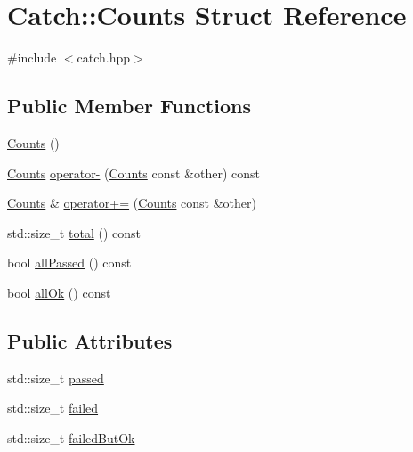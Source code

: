 \hypertarget{struct_catch_1_1_counts}{}\section{Catch\+:\+:Counts Struct Reference}
\label{struct_catch_1_1_counts}


{\ttfamily \#include $<$catch.\+hpp$>$}

\subsection*{Public Member Functions}
\begin{DoxyCompactItemize}
\item 
\hyperlink{struct_catch_1_1_counts_aab9092ce70d4b0179cc743555d2fc39b}{Counts} ()
\item 
\hyperlink{struct_catch_1_1_counts}{Counts} \hyperlink{struct_catch_1_1_counts_aaa10666f559057e3e860d2a5a6fae4c4}{operator-\/} (\hyperlink{struct_catch_1_1_counts}{Counts} const \&other) const
\item 
\hyperlink{struct_catch_1_1_counts}{Counts} \& \hyperlink{struct_catch_1_1_counts_a322a89475cd2cc039140ef371e973677}{operator+=} (\hyperlink{struct_catch_1_1_counts}{Counts} const \&other)
\item 
std\+::size\+\_\+t \hyperlink{struct_catch_1_1_counts_a94f969c09cf52d1339c085c9603cd1d3}{total} () const
\item 
bool \hyperlink{struct_catch_1_1_counts_a84999490e0ecaa3de5e121bf48eda1b3}{all\+Passed} () const
\item 
bool \hyperlink{struct_catch_1_1_counts_a33bd996e016030155b99fe1c51c08991}{all\+Ok} () const
\end{DoxyCompactItemize}
\subsection*{Public Attributes}
\begin{DoxyCompactItemize}
\item 
std\+::size\+\_\+t \hyperlink{struct_catch_1_1_counts_ad28daaf3de28006400208b6dd0c631e6}{passed}
\item 
std\+::size\+\_\+t \hyperlink{struct_catch_1_1_counts_a19982a3817a3bc2c07f0290e71f497a3}{failed}
\item 
std\+::size\+\_\+t \hyperlink{struct_catch_1_1_counts_ac090973a2ff51394cd452718e75c073e}{failed\+But\+Ok}
\end{DoxyCompactItemize}


